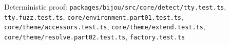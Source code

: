 \begin{itemize}
  Deterministic proof: \texttt{p\allowbreak{}a\allowbreak{}c\allowbreak{}k\allowbreak{}a\allowbreak{}g\allowbreak{}e\allowbreak{}s\allowbreak{}/\allowbreak{}b\allowbreak{}i\allowbreak{}j\allowbreak{}o\allowbreak{}u\allowbreak{}/\allowbreak{}s\allowbreak{}r\allowbreak{}c\allowbreak{}/\allowbreak{}c\allowbreak{}o\allowbreak{}r\allowbreak{}e\allowbreak{}/\allowbreak{}d\allowbreak{}e\allowbreak{}t\allowbreak{}e\allowbreak{}c\allowbreak{}t\allowbreak{}/\allowbreak{}t\allowbreak{}t\allowbreak{}y\allowbreak{}.\allowbreak{}t\allowbreak{}e\allowbreak{}s\allowbreak{}t\allowbreak{}.\allowbreak{}t\allowbreak{}s}, \texttt{t\allowbreak{}t\allowbreak{}y\allowbreak{}.\allowbreak{}f\allowbreak{}u\allowbreak{}z\allowbreak{}z\allowbreak{}.\allowbreak{}t\allowbreak{}e\allowbreak{}s\allowbreak{}t\allowbreak{}.\allowbreak{}t\allowbreak{}s}, \texttt{c\allowbreak{}o\allowbreak{}r\allowbreak{}e\allowbreak{}/\allowbreak{}e\allowbreak{}n\allowbreak{}v\allowbreak{}i\allowbreak{}r\allowbreak{}o\allowbreak{}n\allowbreak{}m\allowbreak{}e\allowbreak{}n\allowbreak{}t\allowbreak{}.\allowbreak{}p\allowbreak{}a\allowbreak{}r\allowbreak{}t\allowbreak{}0\allowbreak{}1\allowbreak{}.\allowbreak{}t\allowbreak{}e\allowbreak{}s\allowbreak{}t\allowbreak{}.\allowbreak{}t\allowbreak{}s}, \texttt{c\allowbreak{}o\allowbreak{}r\allowbreak{}e\allowbreak{}/\allowbreak{}t\allowbreak{}h\allowbreak{}e\allowbreak{}m\allowbreak{}e\allowbreak{}/\allowbreak{}a\allowbreak{}c\allowbreak{}c\allowbreak{}e\allowbreak{}s\allowbreak{}s\allowbreak{}o\allowbreak{}r\allowbreak{}s\allowbreak{}.\allowbreak{}t\allowbreak{}e\allowbreak{}s\allowbreak{}t\allowbreak{}.\allowbreak{}t\allowbreak{}s}, \texttt{c\allowbreak{}o\allowbreak{}r\allowbreak{}e\allowbreak{}/\allowbreak{}t\allowbreak{}h\allowbreak{}e\allowbreak{}m\allowbreak{}e\allowbreak{}/\allowbreak{}e\allowbreak{}x\allowbreak{}t\allowbreak{}e\allowbreak{}n\allowbreak{}d\allowbreak{}.\allowbreak{}t\allowbreak{}e\allowbreak{}s\allowbreak{}t\allowbreak{}.\allowbreak{}t\allowbreak{}s}, \texttt{c\allowbreak{}o\allowbreak{}r\allowbreak{}e\allowbreak{}/\allowbreak{}t\allowbreak{}h\allowbreak{}e\allowbreak{}m\allowbreak{}e\allowbreak{}/\allowbreak{}r\allowbreak{}e\allowbreak{}s\allowbreak{}o\allowbreak{}l\allowbreak{}v\allowbreak{}e\allowbreak{}.\allowbreak{}p\allowbreak{}a\allowbreak{}r\allowbreak{}t\allowbreak{}0\allowbreak{}2\allowbreak{}.\allowbreak{}t\allowbreak{}e\allowbreak{}s\allowbreak{}t\allowbreak{}.\allowbreak{}t\allowbreak{}s}, \texttt{f\allowbreak{}a\allowbreak{}c\allowbreak{}t\allowbreak{}o\allowbreak{}r\allowbreak{}y\allowbreak{}.\allowbreak{}t\allowbreak{}e\allowbreak{}s\allowbreak{}t\allowbreak{}.\allowbreak{}t\allowbreak{}s}

\end{itemize}
